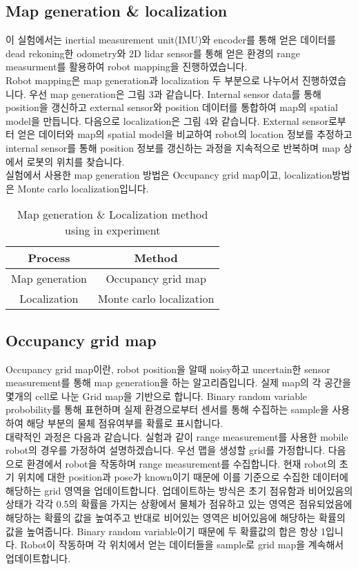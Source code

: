 \documentclass{article}
\begin{document}
		\subsection{Map generation \& localization}
		\indent 이 실험에서는 inertial measurement unit(IMU)와 encoder를 통해 얻은 데이터를 dead rekoning한 odometry와 2D lidar sensor를 통해 얻은 환경의 range measurment를 활용하여 robot mapping을 진행하였습니다.\\
		\indent Robot mapping은 map generation과 localization 두 부분으로 나누어서 진행하였습니다. 우선 map generation은 그림 3과 같습니다. Internal sensor data를 통해 position을 갱신하고 external sensor와 position 데이터를 통합하여 map의 spatial model을 만듭니다. 다음으로 localization은 그림 4와 같습니다. External sensor로부터 얻은 데이터와 map의 spatial model을 비교하여 robot의 location 정보를 추정하고 internal sensor를 통해 position 정보를 갱신하는 과정을 지속적으로 반복하며 map 상에서 로봇의 위치를 찾습니다.\\
		\indent 실험에서 사용한 map generation 방법은 Occupancy grid map이고, localization방법은 Monte carlo localization입니다.\\
		
		\begin{table}[h]
		\centering
		\caption{Map generation \& Localization method using in experiment}
		\begin{tabular}{c|c}
			\textbf{Process} & \textbf{Method}   \\
			\hline
			Map generation & Occupancy grid map\\
			\hline
			Localization & Monte carlo localization\\
		\end{tabular}
		\label{table:methods}
		\end{table}
		
		\subsection{Occupancy grid map}
		Occupancy grid map이란, robot position을 알때 noisy하고 uncertain한 sensor measurement를 통해 map generation을 하는 알고리즘입니다. 실제 map의 각 공간을 몇개의 cell로 나눈 Grid map을 기반으로 합니다. Binary random variable probobility를 통해 표현하며 실제 환경으로부터 센서를 통해 수집하는 sample을 사용하여 해당 부분의 물체 점유여부를 확률로 표시합니다.\\
		\indent 대략적인 과정은 다음과 같습니다. 실험과 같이 range measurement를 사용한 mobile robot의 경우를 가정하여 설명하겠습니다. 우선 맵을 생성할 grid를 가정합니다. 다음으로 환경에서 robot을 작동하며 range measurement를 수집합니다. 현재 robot의 초기 위치에 대한 position과 pose가 known이기 때문에 이를 기준으로 수집한 데이터에 해당하는 grid 영역을 업데이트합니다. 업데이트하는 방식은 초기 점유함과 비어있음의 상태가 각각 0.5의 확률을 가지는 상황에서 물체가 점유하고 있는 영역은 점유되었음에 해당하는 확률의 값을 높여주고 반대로 비어있는 영역은 비어있음에 해당하는 확률의 값을 높여줍니다. Binary random variable이기 때문에 두 확률값의 합은 항상 1입니다. Robot이 작동하며 각 위치에서 얻는 데이터들을 sample로 grid map을 계속해서 업데이트합니다.
		
\end{document}
